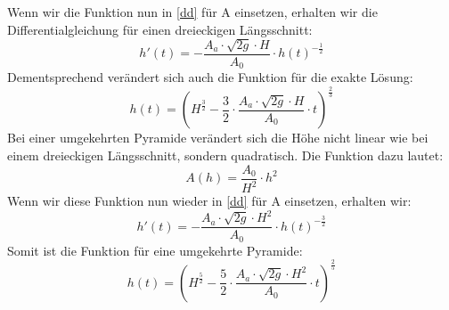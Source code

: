\documentclass[a4paper,12pt]{report}
\begin{document}
Wenn wir die Funktion nun in \ref{dd} für A einsetzen, erhalten wir die Differentialgleichung für einen dreieckigen Längsschnitt:
\begin{equation}\label{d2}
 h'(t)=- \frac{A_a \cdot  \sqrt{2g} \cdot H}{A_0} \cdot h(t)^{- \frac{1}{2}}
\end{equation}  
Dementsprechend verändert sich auch die Funktion für die exakte Lösung: 
\begin{equation}
h(t) = \left( H^{\frac{3}{2}}- \frac{3}{2} \cdot \frac{A_a \cdot  \sqrt{2g} \cdot H}{A_0} \cdot t \right)^{\frac{2}{3}}
\end{equation} 
Bei einer umgekehrten Pyramide verändert sich die Höhe nicht linear wie bei einem dreieckigen Längsschnitt, sondern quadratisch. Die Funktion dazu lautet: 
\begin{equation}
A(h) = \frac{A_0}{H^2} \cdot h^2 
\end{equation} 
Wenn wir diese Funktion nun wieder in \ref{dd} für A einsetzen, erhalten wir: 
\begin{equation}\label{d3}
 h'(t)=- \frac{A_a \cdot  \sqrt{2g} \cdot H^2}{A_0} \cdot h(t)^{- \frac{3}{2}}
\end{equation}
Somit ist die Funktion für eine umgekehrte Pyramide: 
\begin{equation}
h(t) = \left( H^{\frac{5}{2}}- \frac{5}{2} \cdot \frac{A_a \cdot  \sqrt{2g} \cdot H^2}{A_0} \cdot t \right)^{\frac{2}{5}}
\end{equation} \cite[Tec-science]{Tec-science}
\end{document}
